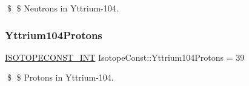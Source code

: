 \$ \$ Neutrons in Yttrium-\/104. \mbox{\label{group___isotope_const-_yttrium-_y104_gac8975dad077b51099c9872efe468aebc}} 
\subsubsection{\texorpdfstring{Yttrium104\+Protons}{Yttrium104Protons}}
{\footnotesize\ttfamily \mbox{\hyperlink{group___isotope_const-_macros_ga5f18360b3e99483a35c32d789e62621c}{I\+S\+O\+T\+O\+P\+E\+C\+O\+N\+S\+T\+\_\+\+I\+NT}} Isotope\+Const\+::\+Yttrium104\+Protons = 39}

\$ \$ Protons in Yttrium-\/104. 